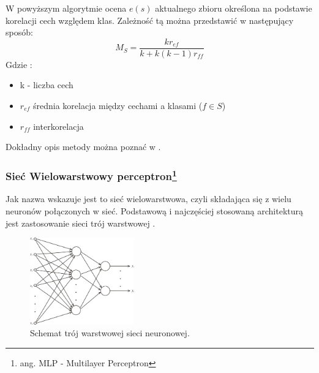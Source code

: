 \documentclass{classrep}
\begin{document}
W powyższym algorytmie ocena $e(s)$ aktualnego zbioru określona na podstawie korelacji cech względem klas. Zależność tą można przedstawić w następujący sposób:
\begin{equation}
M_{S} = \frac{k r_{ef} }{k + k(k-1)r_{ff} }
\end{equation}
Gdzie :
\begin{itemize}
\item k - liczba cech
\item $r_{ef}$ średnia korelacja między cechami a klasami ($f \in S$)
\item $r_{ff}$ interkorelacja
\end{itemize}
Dokładny opis metody można poznać w \cite{Hall1998}.


\subsubsection{Sieć Wielowarstwowy perceptron\footnote{ang. MLP - Multilayer Perceptron}}
\label{MLP}

Jak nazwa wskazuje jest to sieć wielowarstwowa, czyli składająca się z wielu neuronów połączonych w sieć. Podstawową i najczęściej stosowaną architekturą jest zastosowanie sieci trój warstwowej .

\begin{figure}[H]
\centering
\includegraphics[width=0.4\textwidth]{arch_jw}
  \caption{Schemat trój warstwowej  sieci neuronowej.}
  \label{MLParch}
\end{figure}
\end{document}
